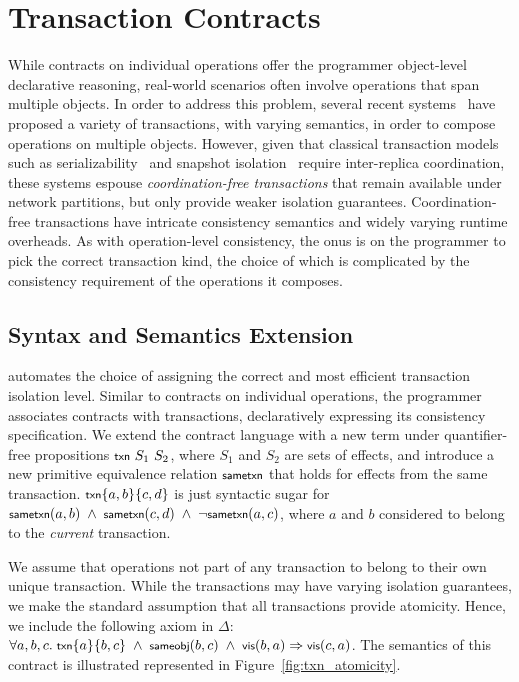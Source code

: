 \section{Transaction Contracts}

While contracts on individual operations offer the programmer object-level
declarative reasoning, real-world scenarios often involve operations that span
multiple objects. In order to address this problem, several recent
systems~\cite{COPS,BurckhardtESOP,BailisHAT} have proposed a variety of
transactions, with varying semantics, in order to compose operations on
multiple objects. However, given that classical transaction models such as
serializability~\cite{} and snapshot isolation~\cite{} require inter-replica
coordination, these systems espouse \emph{coordination-free transactions} that
remain available under network partitions, but only provide weaker isolation
guarantees. Coordination-free transactions have intricate consistency semantics
and widely varying runtime overheads. As with operation-level consistency, the
onus is on the programmer to pick the correct transaction kind, the choice of
which is complicated by the consistency requirement of the operations it
composes.

\subsection{Syntax and Semantics Extension}
\label{sec:syn_sem_ext}

\name automates the choice of assigning the correct and most efficient
transaction isolation level. Similar to contracts on individual operations, the
programmer associates contracts with transactions, declaratively expressing its
consistency specification. We extend the contract language with a new term
under quantifier-free propositions ${\small \txnZ}~S_1~S_2$, where $S_1$ and
$S_2$ are sets of effects, and introduce a new primitive equivalence relation
$\small \sametxnZ$ that holds for effects from the same transaction. $\small
\txn{a,b}{c,d}$ is just syntactic sugar for $\small \sametxn{a}{b} ~\wedge~
\sametxn{c}{d} ~\wedge~ \neg\sametxn{a}{c}$, where $a$ and $b$ considered to
belong to the \emph{current} transaction.

We assume that operations not part of any transaction to belong to their own
unique transaction. While the transactions may have varying isolation
guarantees, we make the standard assumption that all transactions provide
atomicity. Hence, we include the following axiom in $\Delta$: $\small \forall
a,b,c.~\txn{a}{b,c} ~\wedge~ \sameobj{b}{c} ~\wedge~ \vis{b}{a} \Rightarrow
\vis{c}{a}$. The semantics of this contract is illustrated represented in
Figure~\ref{fig:txn_atomicity}.

